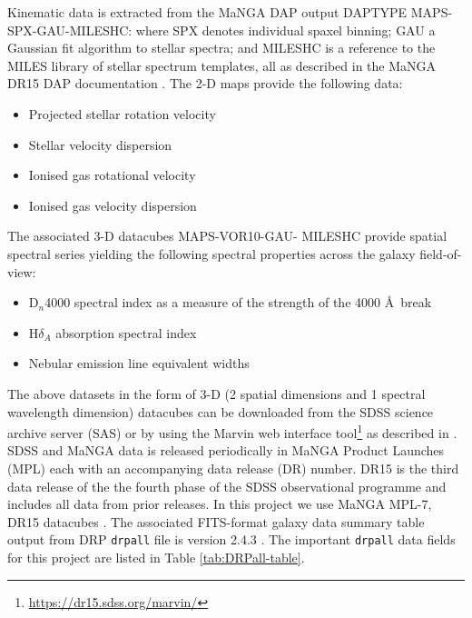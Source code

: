 Kinematic data is extracted from the MaNGA DAP output DAPTYPE MAPS-SPX-GAU-MILESHC: where SPX denotes individual spaxel binning; GAU a Gaussian fit algorithm to stellar spectra; and MILESHC is a reference to the MILES library \citep{2011A&A...532A..95F} of stellar spectrum templates, all as described in the MaNGA DR15 DAP documentation \citet{2019arXiv190100856W}. The 2-D maps provide the following data: 

\begin{itemize}
    \item Projected stellar rotation velocity
    \item Stellar velocity dispersion
    \item Ionised gas rotational velocity
    \item Ionised gas velocity dispersion
\end{itemize}

The associated 3-D datacubes MAPS-VOR10-GAU-
MILESHC provide spatial spectral series yielding the following spectral properties across the galaxy field-of-view:

\begin{itemize}
    \item D$_n$4000 spectral index as a measure of the strength of the 4000 \AA\ break
    \item H$\delta_A$ absorption spectral index
    \item Nebular emission line equivalent widths
\end{itemize}

The above datasets in the form of 3-D (2 spatial dimensions and 1 spectral wavelength dimension) datacubes can be downloaded from the SDSS science archive server (SAS) or by using the Marvin web interface tool\footnote{\href{https://dr15.sdss.org/marvin/}{https://dr15.sdss.org/marvin/}} as described in \cite{2018arXiv181203833C}. SDSS and MaNGA data is released periodically in MaNGA Product Launches (MPL) each with an accompanying data release (DR) number. DR15 is the third data release of the the fourth phase of the SDSS observational programme and includes all data from prior releases. In this project we use MaNGA MPL-7, DR15 datacubes \citep{2019ApJS..240...23A}. The associated FITS-format galaxy data summary table output from DRP \texttt{drpall} file is version 2.4.3 \citep{2016AJ....152...83L}. The important \texttt{drpall} data fields for this project are listed in Table \ref{tab:DRPall-table}.

